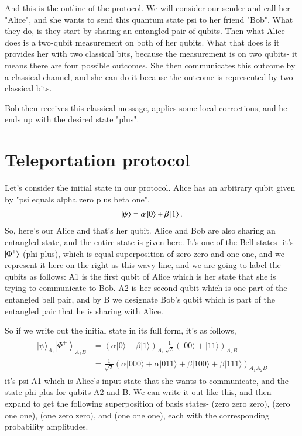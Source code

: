 And this is the outline of the protocol. We will consider our sender and call her "Alice", and she wants to send this quantum state psi to her friend "Bob". What they do, is they start by sharing an entangled pair of qubits. Then what Alice does is a two-qubit measurement on both of her qubits. What that does is it provides her with two classical bits, because the measurement is on two qubits- it means there are four possible outcomes. She then communicates this outcome by a classical channel, and she can do it because the outcome is represented by two classical bits.

Bob then receives this classical message, applies some local corrections, and he ends up with the desired state "plus".

\section{Teleportation protocol}


Let's consider the initial state in our protocol. Alice has an arbitrary qubit given by "psi equals alpha zero plus beta one",
\begin{align}
    \ket{\psi} = \alpha\ket{0} + \beta\ket{1}.
\end{align}
So, here's our Alice and that's her qubit. Alice and Bob are also sharing an entangled state, and the entire state is given here. It's one of the Bell states- it's $\ket{\Phi^+}$ (phi plus), which is equal superposition of zero zero and one one, and we represent it here on the right as this wavy line, and we are going to label the qubits as follows: A1 is the first qubit of Alice which is her state that she is trying to communicate to Bob. A2 is her second qubit which is one part of the entangled bell pair, and by B we designate Bob's qubit which is part of the entangled pair that he is sharing with Alice.

So if we write out the initial state in its full form, it's as follows,
\begin{align}
    \begin{aligned}
|\psi\rangle_{A_{1}}\left|\Phi^{+}\right\rangle_{A_{2} B} &=(\alpha|0\rangle+\beta|1\rangle)_{A_{1}} \frac{1}{\sqrt{2}}(|00\rangle+|11\rangle)_{A_{2} B} \\
&=\frac{1}{\sqrt{2}}(\alpha|000\rangle+\alpha|011\rangle+\beta|100\rangle+\beta|111\rangle)_{A_{1} A_{2} B}
\end{aligned}
\end{align}
it's psi A1 which is Alice's input state that she wants to communicate, and the state phi plus for qubits A2 and B. We can write it out like this, and then expand to get the following superposition of basis states- (zero zero zero), (zero one one), (one zero zero), and (one one one), each with the corresponding probability amplitudes.


